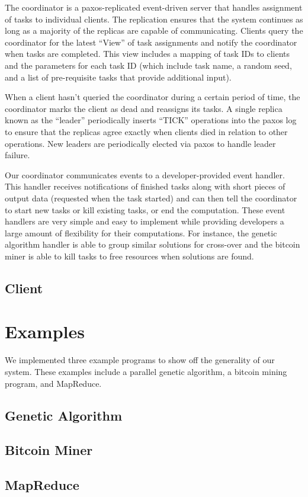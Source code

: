 \documentclass [11pt, twocolumn] {article}
\begin{document}
The coordinator is a paxos-replicated event-driven server that handles assignment of tasks to individual clients. The replication ensures that the system continues as long as a majority of the replicas are capable of communicating. Clients query the coordinator for the latest ``View'' of task assignments and notify the coordinator when tasks are completed. This view includes a mapping of task IDs to clients and the parameters for each task ID (which include task name, a random seed, and a list of pre-requisite tasks that provide additional input). 

When a client hasn't queried the coordinator during a certain period of time, the coordinator marks the client as dead and reassigns its tasks. A single replica known as the ``leader'' periodically inserts ``TICK'' operations into the paxos log to ensure that the replicas agree exactly when clients died in relation to other operations. New leaders are periodically elected via paxos to handle leader failure. 

Our coordinator communicates events to a developer-provided event handler. This handler receives notifications of finished tasks along with short pieces of output data (requested when the task started) and can then tell the coordinator to start new tasks or kill existing tasks, or end the computation. These event handlers are very simple and easy to implement while providing developers a large amount of flexibility for their computations. For instance, the genetic algorithm handler is able to group similar solutions for cross-over and the bitcoin miner is able to kill tasks to free resources when solutions are found. 

\subsection {Client} 

\section {Examples}

We implemented three example programs to show off the generality of our system. These examples include a parallel genetic algorithm, a bitcoin mining program, and MapReduce. 

\subsection {Genetic Algorithm} 

\subsection {Bitcoin Miner}

\subsection {MapReduce} 
\end{document}

